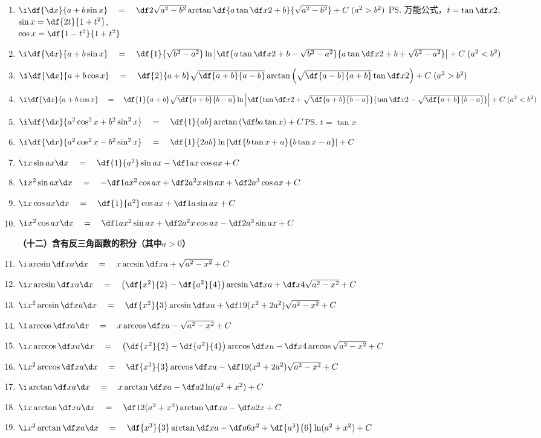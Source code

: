 \begin{enumerate}
  \item $\i\df{{\d x}}{a+b\sin x}\quad=\quad\df 2{\sqrt{a^2-b^2}}\arctan\df{a\tan\df
  x2+b}{\sqrt{a^2-b^2}}+C\;(a^2>b^2)$
  \ps{万能公式，$t=\tan\df x2$,\\
  $\sin x=\df{2t}{1+t^2}$,\\
  $\cos x=\df{1-t^2}{1+t^2}$}
  \item $\i\df{{\d x}}{a+b\sin x}\quad=\quad\df{1}{\sqrt{b^2-a^2}}\ln\left|
  \df{a\tan\df x2+b-\sqrt{b^2-a^2}}{a\tan\df
  x2+b+\sqrt{b^2-a^2}}\right|+C\;(a^2<b^2)$
  \item $\i\df{{\d x}}{a+b\cos
  x}\quad=\quad\df{2}{a+b}\sqrt{\df{a+b}{a-b}}\arctan\left(
  \sqrt{\df{a-b}{a+b}}\tan\df x2\right)+C\;(a^2>b^2)$
  \item $\i\df{{\d x}}{a+b\cos x}\quad=\quad\df{1}{a+b}\sqrt{\df{a+b}{b-a}}\ln\left|
  \df{\tan\df x2+\sqrt{\df{a+b}{b-a}}}{\tan
  \df x2-\sqrt{\df{a+b}{b-a}}}\right|+C\;(a^2<b^2)$
  \item $\i\df{{\d x}}{a^2\cos^2x+b^2\sin^2x}\quad=\quad\df{1}{ab}\arctan\left(\df
  ba\tan x\right)+C$\ps{$t=\tan x$}
  \item $\i\df{{\d x}}{a^2\cos^2x-b^2\sin^2x}\quad=\quad\df{1}{2ab}\ln\left|
  \df{b\tan x+a}{b\tan x-a}\right|+C$
  \item $\i x\sin ax{\d x}\quad=\quad\df{1}{a^2}\sin ax-\df 1ax\cos ax+C$
  \item $\i x^2\sin ax{\d x}\quad=\quad-\df 1ax^2\cos ax+\df 2{a^2}x\sin ax+\df 2{a^3}\cos
  ax+C$
  \item $\i x\cos ax{\d x}\quad=\quad\df{1}{a^2}\cos ax+\df 1a\sin ax+C$
  \item $\i x^2\cos ax{\d x}\quad=\quad\df 1a x^2\sin ax+\df 2{a^2}x\cos ax-\df 2{a^3}\sin
  ax+C$

\bigskip
{\bf （十二）含有反三角函数的积分（其中$a>0$）}
  \item $\i\arcsin\df xa{\d x}\quad=\quad x\arcsin\df xa+\sqrt{a^2-x^2}+C$
  \item $\i x\arcsin\df xa{\d x}\quad=\quad\left(\df{x^2}{2}-\df{a^2}{4}\right)\arcsin\df xa
  +\df x4\sqrt{a^2-x^2}+C$
  \item $\i x^2\arcsin\df xa{\d x}\quad=\quad\df{x^2}{3}\arcsin\df xa+\df
  19(x^2+2a^2)\sqrt{a^2-x^2}+C$
  \item $\i\arccos\df xa{\d x}\quad=\quad x\arccos\df xa-\sqrt{a^2-x^2}+C$
  \item $\i x\arccos\df xa{\d x}\quad=\quad\left(\df{x^2}{2}-\df{a^2}{4}\right)\arccos\df xa
  -\df x4\arccos\sqrt{a^2-x^2}+C$
  \item $\i x^2\arccos\df xa{\d x}\quad=\quad\df{x^3}{3}\arccos\df xa-\df
  19(x^2+2a^2)\sqrt{a^2-x^2}+C$
  \item $\i\arctan\df xa{\d x}\quad=\quad x\arctan\df xa-\df a2\ln(a^2+x^2)+C$
  \item $\i x\arctan\df xa{\d x}\quad=\quad\df 12(a^2+x^2)\arctan\df xa-\df a2x+C$
  \item $\i x^2\arctan\df xa{\d x}\quad=\quad\df{x^3}{3}\arctan\df xa-\df
  a6x^2+\df{a^3}{6}\ln(a^2+x^2)+C$


\end{enumerate}
